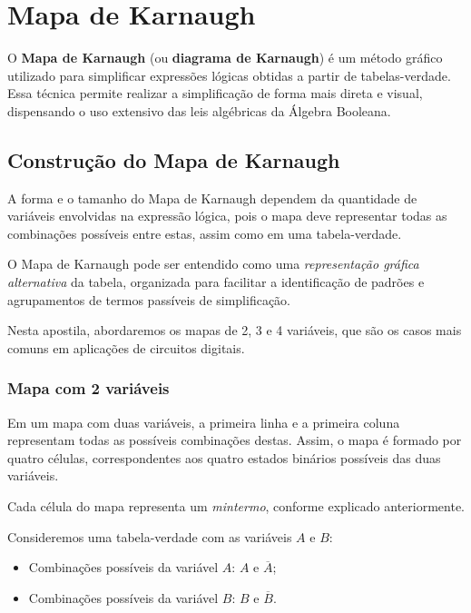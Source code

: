 \documentclass[12pt]{article}
\begin{document}
\section{Mapa de Karnaugh}
\label{sec:mapaKarnaugh}

O \textbf{Mapa de Karnaugh} (ou \textbf{diagrama de Karnaugh}) é um método gráfico utilizado para simplificar expressões lógicas obtidas a partir de tabelas-verdade. Essa técnica permite realizar a simplificação de forma mais direta e visual, dispensando o uso extensivo das leis algébricas da Álgebra Booleana.

\subsection{Construção do Mapa de Karnaugh}

A forma e o tamanho do Mapa de Karnaugh dependem da quantidade de variáveis envolvidas na expressão lógica, pois o mapa deve representar todas as combinações possíveis entre estas, assim como em uma tabela-verdade.  

O Mapa de Karnaugh pode ser entendido como uma \textit{representação gráfica alternativa} da tabela, organizada para facilitar a identificação de padrões e agrupamentos de termos passíveis de simplificação.

Nesta apostila, abordaremos os mapas de 2, 3 e 4 variáveis, que são os casos mais comuns em aplicações de circuitos digitais.

\subsubsection{Mapa com 2 variáveis}
\label{subsec:2variaveis}

Em um mapa com duas variáveis, a primeira linha e a primeira coluna representam todas as possíveis combinações destas. Assim, o mapa é formado por quatro células, correspondentes aos quatro estados binários possíveis das duas variáveis.  

Cada célula do mapa representa um \textit{mintermo}, conforme explicado anteriormente.

\vspace{0.5cm}

Consideremos uma tabela-verdade com as variáveis \(A\) e \(B\):

\begin{itemize}
    \item Combinações possíveis da variável \(A\): $A$ e $\overline{A}$;
    \item Combinações possíveis da variável \(B\): $B$ e $\overline{B}$.
\end{itemize}
\end{document}
